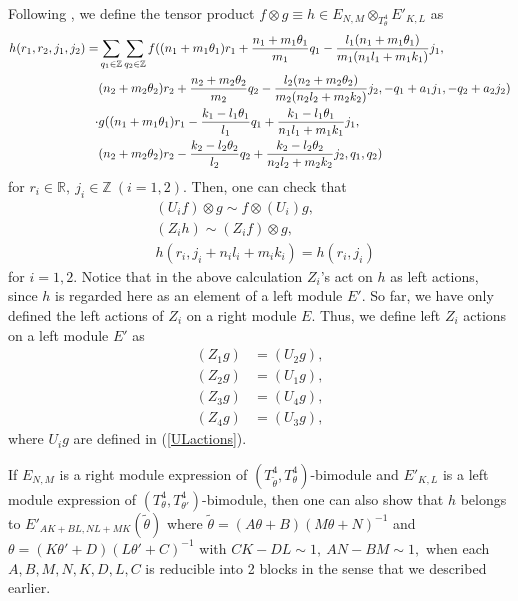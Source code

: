\documentclass[12pt, a4paper]{article}
\newcommand{\Z}{{\mathbb Z}}
\newcommand{\R}{{\mathbb R}}
\begin{document}
 Following \cite{ds02}, we define the tensor product $f \otimes g \equiv h \in E_{N,M}
\otimes_{T^4_\theta} E'_{K,L} $ as
\begin{align} \label{tensorpd}
h(r_1,r_2,j_1,j_2) =  & \sum_{q_1 \in \Z} \sum_{q_2 \in \Z} f((n_1
+m_1 \theta_1)r_1 + \frac{n_1 +m_1 \theta_1}{m_1}q_1 -
\frac{l_1(n_1 +m_1 \theta_1)}{m_1(n_1l_1 +m_1k_1)}j_1,
\notag \\
& (n_2 +m_2 \theta_2)r_2 + \frac{n_2 +m_2 \theta_2}{m_2}q_2 -
\frac{l_2(n_2 +m_2 \theta_2)}{m_2(n_2l_2 +m_2k_2)}j_2, -q_1 +a_1
j_1, -q_2 +a_2 j_2)
\notag \\
   \cdot
   & g( (n_1 +m_1 \theta_1)r_1 - \frac{k_1 - l_1
\theta_1}{l_1}q_1 + \frac{k_1 -l_1 \theta_1}{n_1l_1 +m_1k_1}j_1,
\notag \\
& (n_2 +m_2 \theta_2)r_2 - \frac{k_2 - l_2 \theta_2}{l_2}q_2 +
\frac{k_2 -l_2 \theta_2}{n_2l_2 +m_2k_2}j_2,
 q_1, q_2)
\end{align}
for $r_i \in \R, \  j_i \in \Z \ (i =1,2) .$ Then, one can check
that
\begin{align*}
& (U_i f) \otimes g  \sim f \otimes (U_i)g , \\
& (Z_i h) \sim  (Z_i f) \otimes g, \\
& h(r_i, j_i + n_il_i + m_i k_i ) = h(r_i, j_i)
\end{align*}
for $i=1,2$. Notice that in the above calculation $Z_i$'s act on
$h$ as  left actions, since $h$ is regarded here as an element of
a left module $E'$. So far, we have only defined the left actions
of $Z_i$ on a right module $E$. Thus, we define left $Z_i$ actions
on a left module $E'$ as
\begin{align*}
(Z_1 g) & =  (U_2 g) , \\
(Z_2 g) & =  (U_1 g) , \\
(Z_3 g) & =  (U_4 g) , \\
(Z_4 g) & =  (U_3 g) ,
\end{align*}
where $ U_i g $ are defined in (\ref{ULactions}).

If  $E_{N,M}$ is a right module expression of $
(T^4_{\tilde{\theta}}, T^4_{\theta} )$-bimodule and $E'_{K,L}$ is
a left module expression of $ (T^4_{\theta}, T^4_{\theta'}
)$-bimodule, then
 one can also show that $h$ belongs to $ E'_{AK + BL,
NL +MK} (\tilde{\theta})$ where $\tilde{\theta} =(A\theta
+B)(M\theta +N)^{-1}$ and $\theta =(K\theta' +D)(L\theta'
+C)^{-1}$ with $CK-DL \sim 1, \ AN-BM \sim 1 , $ when each
$A,B,M,N,K,D,L,C$ is reducible into 2 blocks in the sense that we
described earlier.
\end{document}
